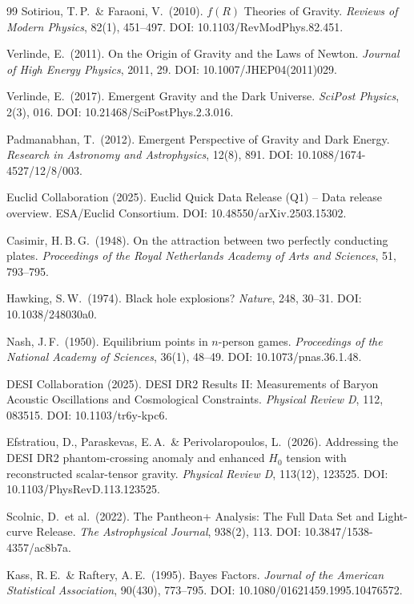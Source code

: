 \documentclass[aps,prd,twocolumn,superscriptaddress,nofootinbib]{revtex4-2}
\begin{document}
\begin{thebibliography}{99}
Sotiriou, T.\,P.\ \& Faraoni, V.\ (2010).
$f(R)$ Theories of Gravity.
\textit{Reviews of Modern Physics}, 82(1), 451--497.
DOI: 10.1103/RevModPhys.82.451.

Verlinde, E.\ (2011).
On the Origin of Gravity and the Laws of Newton.
\textit{Journal of High Energy Physics}, 2011, 29.
DOI: 10.1007/JHEP04(2011)029.

Verlinde, E.\ (2017).
Emergent Gravity and the Dark Universe.
\textit{SciPost Physics}, 2(3), 016.
DOI: 10.21468/SciPostPhys.2.3.016.

Padmanabhan, T.\ (2012).
Emergent Perspective of Gravity and Dark Energy.
\textit{Research in Astronomy and Astrophysics}, 12(8), 891.
DOI: 10.1088/1674-4527/12/8/003.

Euclid Collaboration (2025).
Euclid Quick Data Release (Q1) -- Data release overview.
ESA/Euclid Consortium.
DOI: 10.48550/arXiv.2503.15302.

Casimir, H.\,B.\,G.\ (1948).
On the attraction between two perfectly conducting plates.
\textit{Proceedings of the Royal Netherlands Academy of Arts and Sciences}, 51, 793--795.

Hawking, S.\,W.\ (1974).
Black hole explosions?
\textit{Nature}, 248, 30--31.
DOI: 10.1038/248030a0.

Nash, J.\,F.\ (1950).
Equilibrium points in $n$-person games.
\textit{Proceedings of the National Academy of Sciences}, 36(1), 48--49.
DOI: 10.1073/pnas.36.1.48.

DESI Collaboration (2025).
DESI DR2 Results II: Measurements of Baryon Acoustic Oscillations and Cosmological Constraints.
\textit{Physical Review D}, 112, 083515.
DOI: 10.1103/tr6y-kpc6.

Efstratiou, D., Paraskevas, E.\,A.\ \& Perivolaropoulos, L.\ (2026).
Addressing the DESI DR2 phantom-crossing anomaly and enhanced $H_0$ tension with reconstructed scalar-tensor gravity.
\textit{Physical Review D}, 113(12), 123525.
DOI: 10.1103/PhysRevD.113.123525.

Scolnic, D.\ et al.\ (2022).
The Pantheon+ Analysis: The Full Data Set and Light-curve Release.
\textit{The Astrophysical Journal}, 938(2), 113.
DOI: 10.3847/1538-4357/ac8b7a.

Kass, R.\,E.\ \& Raftery, A.\,E.\ (1995).
Bayes Factors.
\textit{Journal of the American Statistical Association}, 90(430), 773--795.
DOI: 10.1080/01621459.1995.10476572.


\end{thebibliography}
\end{document}

